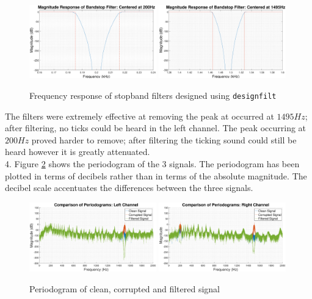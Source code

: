 \documentclass{article}
\begin{document}
\begin{figure}[H]
    \centering
    \includegraphics[width=0.49\textwidth]{mag_spec_band_stop_1}
    \includegraphics[width=0.49\textwidth]{mag_spec_band_stop_2}
    \caption{Frequency response of stopband filters designed using {\tt designfilt}}
    \label{fig:stop_band_filters}
\end{figure}

The filters were extremely effective at removing the peak at occurred at $1495Hz$; after filtering, no ticks could be heard in the left channel. The peak occurring at $200Hz$ proved harder to remove; after filtering the ticking sound could still be heard however it is greatly attenuated. \\


4. Figure \ref{fig:compare_periodograms} shows the periodogram of the 3 signals. The periodogram has been plotted in terms of decibels rather than in terms of the absolute magnitude. The decibel scale accentuates the differences between the three signals. 

\begin{figure}[H]
    \centering
    \includegraphics[width=0.49\textwidth]{compare_left}
    \includegraphics[width=0.49\textwidth]{compare_right}
    \caption{Periodogram of clean, corrupted and filtered signal}
    \label{fig:compare_periodograms}
\end{figure}
\end{document}
